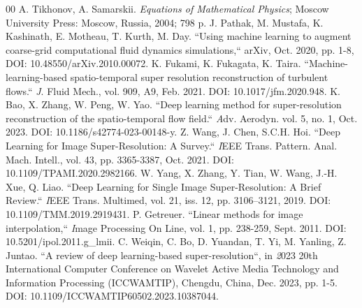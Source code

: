 \documentclass{ieeeaccess}
\begin{document}
{\begin{thebibliography}{00}
A. Tikhonov, A. Samarskii. 
 {\textit{ Equations of Mathematical Physics}}; 
Moscow University Press: Moscow, Russia, 2004; 798 p.
J. Pathak, M. Mustafa, K. Kashinath,  E. Motheau,  T. Kurth, M.  Day.  
 ``Using machine learning to augment coarse-grid computational fluid dynamics simulations,``  
arXiv, Oct. 2020, pp. 1-8, DOI: 10.48550/arXiv.2010.00072.
K. Fukami, K. Fukagata, K. Taira. 
``Machine-learning-based spatio-temporal super resolution reconstruction of turbulent flows.`` 
 {\emph J. Fluid Mech.}, vol. 909, A9, Feb. 2021.
DOI: 10.1017/jfm.2020.948.
K. Bao, X. Zhang, W. Peng, W. Yao.
``Deep learning method for super-resolution reconstruction of the spatio-temporal flow field.`` 
 {\emph Adv. Aerodyn}. vol. 5,   no. 1,  Oct. 2023.
DOI: 10.1186/s42774-023-00148-y.
Z. Wang,  J. Chen,  S.C.H. Hoi. 
``Deep Learning for Image Super-Resolution: A Survey.`` 
{\emph IEEE Trans. Pattern. Anal. Mach. Intell.},  vol. 43, pp. 3365-3387, Oct. 2021.
DOI: 10.1109/TPAMI.2020.2982166.
 W. Yang, X. Zhang,  Y. Tian,  W. Wang, J.-H. Xue,  Q. Liao.  
``Deep Learning for Single Image Super-Resolution: A Brief Review.`` 
 {\emph IEEE Trans. Multimed},  vol. 21, iss. 12, 
  pp. 3106–3121, 2019.
 DOI: 10.1109/TMM.2019.2919431.
 P.  Getreuer.
 ``Linear methods for image interpolation,``  
{\emph Image Processing On Line},  vol. 1, pp. 238-259, Sept. 2011.
DOI: 10.5201/ipol.2011.g\_lmii.
C. Weiqin, C. Bo, D. Yuandan, T. Yi, M. Yanling, 
Z. Juntao.  
``A review of deep learning-based super-resolution``, in  {\emph 2023 20th International Computer Conference on Wavelet Active Media Technology and Information Processing (ICCWAMTIP),} Chengdu, China, Dec. 2023, pp. 1-5.
DOI: 10.1109/ICCWAMTIP60502.2023.10387044.


\end{thebibliography}}
\end{document}
